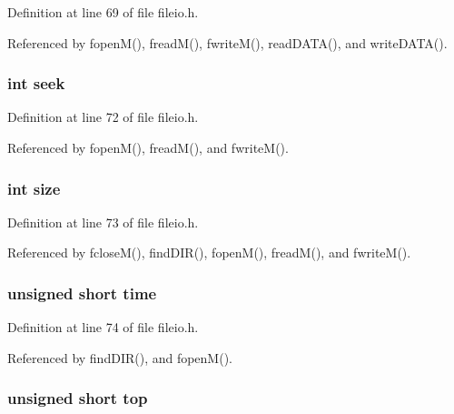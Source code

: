 Definition at line 69 of file fileio.\-h.



Referenced by fopen\-M(), fread\-M(), fwrite\-M(), read\-D\-A\-T\-A(), and write\-D\-A\-T\-A().

\hypertarget{struct_m_f_i_l_e_ae9fff3db126e97d7628ae0cf472e47b7}{
\subsubsection[{seek}]{\setlength{\rightskip}{0pt plus 5cm}int seek}}\label{struct_m_f_i_l_e_ae9fff3db126e97d7628ae0cf472e47b7}


Definition at line 72 of file fileio.\-h.



Referenced by fopen\-M(), fread\-M(), and fwrite\-M().

\hypertarget{struct_m_f_i_l_e_a439227feff9d7f55384e8780cfc2eb82}{
\subsubsection[{size}]{\setlength{\rightskip}{0pt plus 5cm}int size}}\label{struct_m_f_i_l_e_a439227feff9d7f55384e8780cfc2eb82}


Definition at line 73 of file fileio.\-h.



Referenced by fclose\-M(), find\-D\-I\-R(), fopen\-M(), fread\-M(), and fwrite\-M().

\hypertarget{struct_m_f_i_l_e_a9e291d833ba33b59d6063a0cd586a86b}{
\subsubsection[{time}]{\setlength{\rightskip}{0pt plus 5cm}unsigned short time}}\label{struct_m_f_i_l_e_a9e291d833ba33b59d6063a0cd586a86b}


Definition at line 74 of file fileio.\-h.



Referenced by find\-D\-I\-R(), and fopen\-M().

\hypertarget{struct_m_f_i_l_e_a5c1244c5c185fad943dea5b4ffb5cef5}{
\subsubsection[{top}]{\setlength{\rightskip}{0pt plus 5cm}unsigned short top}}\label{struct_m_f_i_l_e_a5c1244c5c185fad943dea5b4ffb5cef5}


